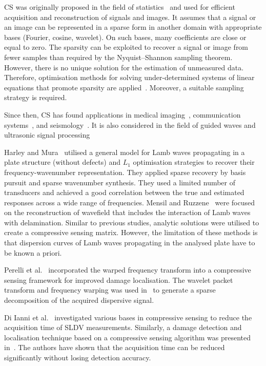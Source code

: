 CS was originally proposed in the field of statistics~\cite{Candes2006,Donoho2006} and used for efficient acquisition and reconstruction of signals and images.
It assumes that a signal or an image can be represented in a sparse form in another domain with appropriate bases (Fourier, cosine, wavelet).
On such bases, many coefficients are close or equal to zero.
The sparsity can be exploited to recover a signal or image from fewer samples than required by the Nyquist–Shannon sampling theorem.
However, there is no unique solution for the estimation of unmeasured data.
Therefore, optimisation methods for solving under-determined systems of linear equations that promote sparsity are applied~\cite{Chen1998,VanEwoutBerg2008,VandenBerg2019}.
Moreover, a suitable sampling strategy is required.

Since then, CS has found applications in medical imaging~\cite{Lustig2007}, communication systems~\cite{Gao2018}, and seismology~\cite{Herrmann2012}.
It is also considered in the field of guided waves and ultrasonic signal processing~\cite{Harley2013,Mesnil2016,Perelli2012,Perelli2015,DiIanni2015,KeshmiriEsfandabadi2018,Chang2020}

Harley and Mura~\cite{Harley2013} utilised a general model for Lamb waves propagating in a plate structure (without defects) and $L_1$ optimisation strategies to recover their frequency-wavenumber representation. 
They applied sparse recovery by basis pursuit and sparse wavenumber synthesis.
They used a limited number of transducers and achieved a good correlation between the true and estimated responses across a wide range of frequencies.
Mensil and Ruzzene~\cite{Mesnil2016} were focused on the reconstruction of wavefield that includes the interaction of Lamb waves with delamination.
Similar to previous studies, analytic solutions were utilised to create a compressive sensing matrix.
However, the limitation of these methods is that dispersion curves of Lamb waves propagating in the analysed plate have to be known a priori.

Perelli et al.~\cite{Perelli2012} incorporated the warped frequency transform into a compressive sensing framework for improved damage localisation.
The wavelet packet transform and frequency warping was used in~\cite{Perelli2015} to generate a sparse decomposition of the acquired dispersive signal.

Di Ianni et al.~\cite{DiIanni2015} investigated various bases in compressive sensing to reduce the acquisition time of SLDV measurements.
Similarly, a damage detection and localisation technique based on a compressive sensing algorithm was presented in~\cite{KeshmiriEsfandabadi2018}.
The authors have shown that the acquisition time can be reduced significantly without losing detection accuracy.

